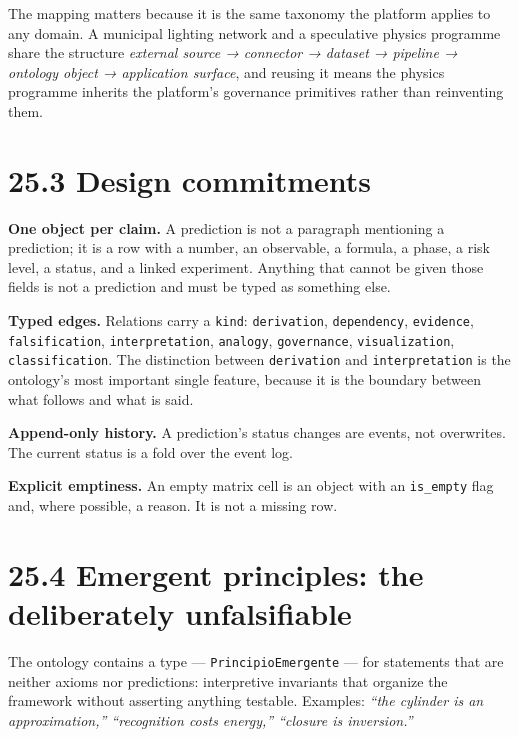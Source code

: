 \documentclass[
  11pt]{report}
\begin{document}
The mapping matters because it is the same taxonomy the platform applies
to any domain. A municipal lighting network and a speculative physics
programme share the structure \emph{external source → connector →
dataset → pipeline → ontology object → application surface}, and reusing
it means the physics programme inherits the platform's governance
primitives rather than reinventing them.

\hypertarget{design-commitments}{%
\section{25.3 Design commitments}\label{design-commitments}}

\textbf{One object per claim.} A prediction is not a paragraph
mentioning a prediction; it is a row with a number, an observable, a
formula, a phase, a risk level, a status, and a linked experiment.
Anything that cannot be given those fields is not a prediction and must
be typed as something else.

\textbf{Typed edges.} Relations carry a \texttt{kind}:
\texttt{derivation}, \texttt{dependency}, \texttt{evidence},
\texttt{falsification}, \texttt{interpretation}, \texttt{analogy},
\texttt{governance}, \texttt{visualization}, \texttt{classification}.
The distinction between \texttt{derivation} and \texttt{interpretation}
is the ontology's most important single feature, because it is the
boundary between what follows and what is said.

\textbf{Append-only history.} A prediction's status changes are events,
not overwrites. The current status is a fold over the event log.

\textbf{Explicit emptiness.} An empty matrix cell is an object with an
\texttt{is\_empty} flag and, where possible, a reason. It is not a
missing row.

\hypertarget{emergent-principles-the-deliberately-unfalsifiable}{%
\section{25.4 Emergent principles: the deliberately
unfalsifiable}\label{emergent-principles-the-deliberately-unfalsifiable}}

The ontology contains a type --- \texttt{PrincipioEmergente} --- for
statements that are neither axioms nor predictions: interpretive
invariants that organize the framework without asserting anything
testable. Examples: \emph{``the cylinder is an approximation,''
``recognition costs energy,'' ``closure is inversion.''}
\end{document}
